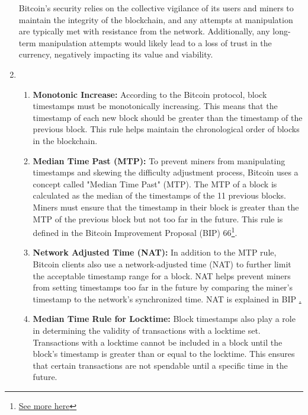 \documentclass{article}
\begin{document}
\begin{enumerate}
    Bitcoin's security relies on the collective vigilance of its users and miners to maintain the integrity of the blockchain, and any attempts at manipulation are typically met with resistance from the network. Additionally, any long-term manipulation attempts would likely lead to a loss of trust in the currency, negatively impacting its value and viability.
    
    \item \\
    \begin{enumerate}
  \item \textbf{Monotonic Increase:} According to the Bitcoin protocol, block timestamps must be monotonically increasing. This means that the timestamp of each new block should be greater than the timestamp of the previous block. This rule helps maintain the chronological order of blocks in the blockchain.

  \item \textbf{Median Time Past (MTP):} To prevent miners from manipulating timestamps and skewing the difficulty adjustment process, Bitcoin uses a concept called "Median Time Past" (MTP). The MTP of a block is calculated as the median of the timestamps of the 11 previous blocks. Miners must ensure that the timestamp in their block is greater than the MTP of the previous block but not too far in the future. This rule is defined in the Bitcoin Improvement Proposal (BIP) 66\footnote{\href{https://github.com/bitcoin/bips/blob/master/bip-0066.mediawiki}{See more here}}.

  \item \textbf{Network Adjusted Time (NAT):} In addition to the MTP rule, Bitcoin clients also use a network-adjusted time (NAT) to further limit the acceptable timestamp range for a block. NAT helps prevent miners from setting timestamps too far in the future by comparing the miner's timestamp to the network's synchronized time. NAT is explained in BIP \href{https://github.com/bitcoin/bips/blob/master/bip-0113.mediawiki}.

  \item \textbf{Median Time Rule for Locktime:} Block timestamps also play a role in determining the validity of transactions with a locktime set. Transactions with a locktime cannot be included in a block until the block's timestamp is greater than or equal to the locktime. This ensures that certain transactions are not spendable until a specific time in the future.


    \end{enumerate}

\end{enumerate}
\end{document}
